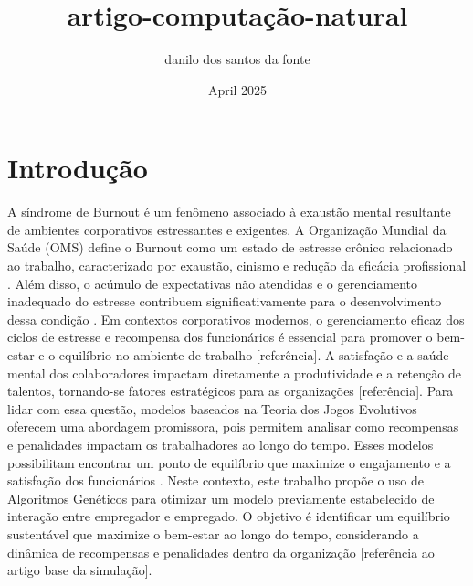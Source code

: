 \documentclass{article}
\title{artigo-computação-natural}
\author{danilo dos santos da fonte}
\date{April 2025}
\begin{document}
\maketitle

\section{Introdução}

A síndrome de Burnout é um fenômeno associado à exaustão mental resultante de ambientes corporativos estressantes e exigentes. A Organização Mundial da Saúde (OMS) define o Burnout como um estado de estresse crônico relacionado ao trabalho, caracterizado por exaustão, cinismo e redução da eficácia profissional \cite{Downey2023}. Além disso, o acúmulo de expectativas não atendidas e o gerenciamento inadequado do estresse contribuem significativamente para o desenvolvimento dessa condição \cite{Zhang2020Burnout}.
Em contextos corporativos modernos, o gerenciamento eficaz dos ciclos de estresse e recompensa dos funcionários é essencial para promover o bem-estar e o equilíbrio no ambiente de trabalho [referência]. A satisfação e a saúde mental dos colaboradores impactam diretamente a produtividade e a retenção de talentos, tornando-se fatores estratégicos para as organizações [referência].
Para lidar com essa questão, modelos baseados na Teoria dos Jogos Evolutivos oferecem uma abordagem promissora, pois permitem analisar como recompensas e penalidades impactam os trabalhadores ao longo do tempo. Esses modelos possibilitam encontrar um ponto de equilíbrio que maximize o engajamento e a satisfação dos funcionários \cite{Zhang2020Burnout}.
Neste contexto, este trabalho propõe o uso de Algoritmos Genéticos para otimizar um modelo previamente estabelecido de interação entre empregador e empregado. O objetivo é identificar um equilíbrio sustentável que maximize o bem-estar ao longo do tempo, considerando a dinâmica de recompensas e penalidades dentro da organização [referência ao artigo base da simulação].



\end{document}
